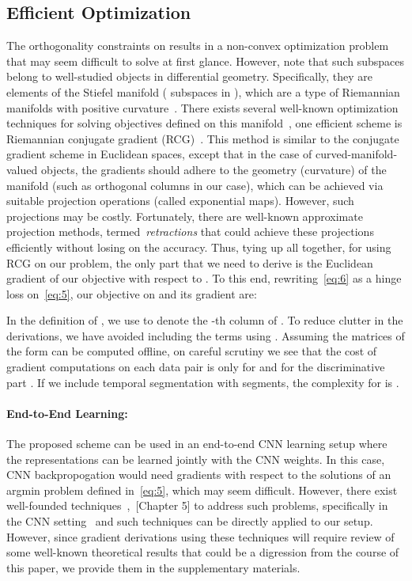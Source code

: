 \documentclass[runningheads]{llncs}
\begin{document}
\subsection{Efficient Optimization}
The orthogonality constraints on  results in a non-convex optimization problem that may seem difficult to solve at first glance. However, note that such subspaces belong to well-studied objects in differential geometry. Specifically, they are elements of the Stiefel manifold  ( subspaces in ), which are a type of Riemannian manifolds with positive curvature~\cite{boothby1986introduction}. There exists several well-known optimization techniques for solving objectives defined on this manifold~\cite{absil2009optimization}, one efficient scheme is Riemannian conjugate gradient (RCG)~\cite{smith1994optimization}. This method is similar to the conjugate gradient scheme in Euclidean spaces, except that in the case of curved-manifold-valued objects, the gradients should adhere to the geometry (curvature) of the manifold (such as orthogonal columns in our case), which can be achieved via suitable projection operations (called exponential maps). However, such projections may be costly. Fortunately, there are well-known approximate projection methods, termed~\emph{retractions} that could achieve these projections efficiently without losing on the accuracy. Thus, tying up all together, for using RCG on our problem, the only part that we need to derive is the Euclidean gradient of our objective with respect to . To this end, rewriting~\eqref{eq:6} as a hinge loss on~\eqref{eq:5}, our objective on  and its gradient are:


In the definition of , we use  to denote the -th column of . To reduce clutter in the derivations, we have avoided including the terms using . Assuming the matrices of the form  can be computed offline, on careful scrutiny we see that the cost of gradient computations on each data pair is only  for  and  for the discriminative part . If we include temporal segmentation with  segments, the complexity for  is .

\noindent\paragraph*{\textbf{End-to-End Learning:}} The proposed scheme can be used in an end-to-end CNN learning setup where the representations can be learned jointly with the CNN weights. In this case, CNN backpropogation would need gradients with respect to the solutions of an argmin problem defined in~\eqref{eq:5}, which may seem difficult. However, there exist well-founded techniques~\cite{chiang1984fundamental},~\cite{faugeras1993three}[Chapter 5] to address such problems, specifically in the CNN setting~\cite{gould2016differentiating} and such techniques can be directly applied to our setup. However, since gradient derivations using these techniques will require review of some well-known theoretical results that could be a digression from the course of this paper, we provide them in the supplementary materials. 
\end{document}
